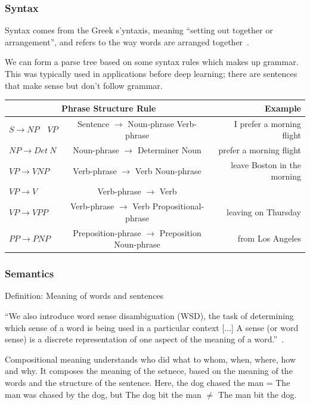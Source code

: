 \documentclass[11pt]{article}
\begin{document}
\subsubsection{Syntax}

Syntax comes from the Greek s'yntaxis, meaning “setting out together or arrangement”, and refers to the way words are arranged together~\cite{book-speech-and-language-processing}.

We can form a parse tree based on some syntax rules which makes up grammar. This was typically used in applications before deep learning; there are sentences that make sense but don't follow grammar.

\begin{tabular}{l c r}
    \hline
    \multicolumn{2}{c}{\textbf{Phrase Structure Rule}} & \textbf{Example} \\
    \hline
    $S \rightarrow NP \quad VP$ & Sentence $\rightarrow$ Noun-phrase Verb-phrase & I prefer a morning flight \\
    $NP \rightarrow Det\ N$ & Noun-phrase $\rightarrow$ Determiner Noun & prefer a morning flight\\
    $VP \rightarrow V NP$ & Verb-phrase $\rightarrow$ Verb Noun-phrase & leave Boston in the morning\\
    $VP \rightarrow V$ & Verb-phrase $\rightarrow$ Verb & \\
    $VP \rightarrow V PP$ & Verb-phrase $\rightarrow$ Verb Propositional-phrase & leaving on Thursday\\
    $PP \rightarrow P NP$ & Preposition-phrase $\rightarrow$ Preposition Noun-phrase & from Los Angeles\\
\end{tabular}

\subsubsection{Semantics}

Definition: Meaning of words and sentences

``We also introduce word sense disambiguation (WSD), the task of determining which sense of a word is being used in a particular context [...] A sense (or word sense) is a discrete representation of one aspect of the meaning of a word.''~\cite{book-speech-and-language-processing}.

Compositional meaning understands who did what to whom, when, where, how and why. It composes the meaning of the setnece, based on the meaning of the words and the structure of the sentence. Here, the dog chased the man = The man was chased by the dog, but The dog bit the man $\neq$ The man bit the dog.
\end{document}
